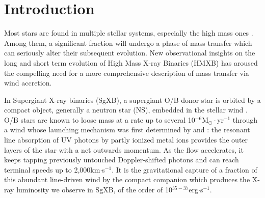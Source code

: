 \documentclass{aa}
\makeatletter
\newcommand{\sgx}{SgXB\xspace}
\newcommand*{\hmxb}{HMXB\@\xspace}
\newcommand*{\rlof}{RLOF\@\xspace}
\newcommand*{\ns}{NS\@\xspace}
\makeatother
\begin{document}
\section{Introduction}

Most stars are found in multiple stellar systems, especially the high mass ones \citep{Duchene2013}. Among them, a significant fraction will undergo a phase of mass transfer which can seriously alter their subsequent evolution. New observational insights on the long \citep{Abbott2016a} and short term \citep{Grinberg2017} evolution of High Mass X-ray Binaries (\hmxb) has aroused the compelling need for a more comprehensive description of mass transfer via wind accretion. 


In Supergiant X-ray binaries (\sgx), a supergiant O/B donor star is orbited by a compact object, generally a neutron star (\ns), embedded in the stellar wind \citep[for a recent review, see][]{Martinez-Nunez2017}. O/B stars are known to loose mass at a rate up to several 10$^{-6}$M$_{\odot}\cdot$yr$^{-1}$ through a wind whose launching mechanism was first determined by \cite{Lucy1970} and \cite{Castor1975} : the resonant line absorption of UV photons by partly ionized metal ions provides the outer layers of the star with a net outwards momentum. As the flow accelerates, it keeps tapping previously untouched Doppler-shifted photons and can reach terminal speeds up to 2,000km$\cdot$s$^{-1}$. It is the gravitational capture of a fraction of this abundant line-driven wind by the compact companion which produces the X-ray luminosity we observe in \sgx, of the order of 10$^{35-37}$erg$\cdot$s$^{-1}$.
\end{document}
